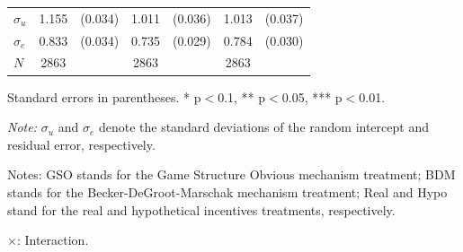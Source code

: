 \documentclass[12pt]{article}
\newcommand{\sym}[1]{\rlap{$^{#1}$}}
\begin{document}
\begin{table}[H]
{\begin{tabular}{l*{3}{cc}}
$\sigma_u $    &       1.155\sym{***}&     (0.034)&       1.011\sym{***}&     (0.036)&       1.013\sym{***}&     (0.037)\\
$\sigma_e$     &       0.833\sym{***}&     (0.034)&       0.735\sym{***}&     (0.029)&       0.784\sym{***}&     (0.030)\\
\hline
\(N\)       &        2863         &            &        2863         &            &        2863         &            \\
\hline\hline
\end{tabular}
}


\begin{tablenotes}
            \footnotesize
            \item Standard errors in parentheses. * p$<$0.1, ** p$<$0.05, *** p$<$0.01.
            \item \textit{Note:} $\sigma_u$ and $\sigma_e$ denote the standard deviations of the random intercept and residual error, respectively.
            \item Notes: GSO stands for the Game Structure Obvious mechanism treatment; BDM stands for the Becker-DeGroot-Marschak mechanism treatment; Real and Hypo stand for the real and hypothetical incentives treatments, respectively.
           \item $\times$: Interaction.
        \end{tablenotes}

\end{table}

\clearpage
\end{document}
